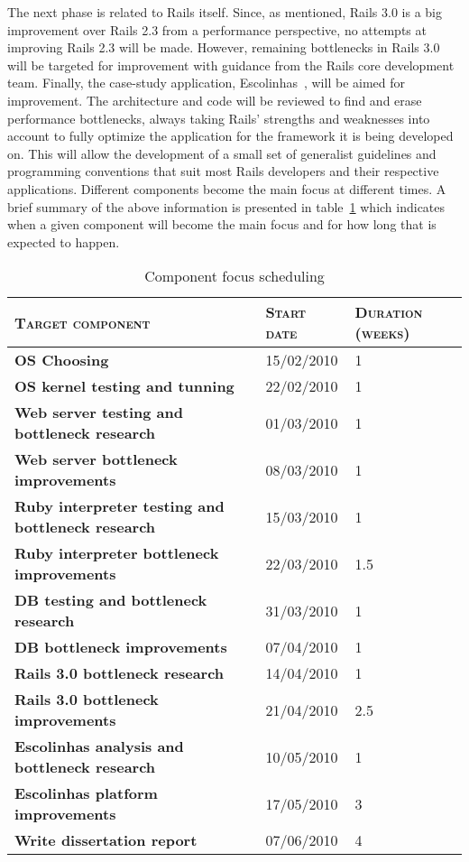 The next phase is related to Rails itself. Since, as mentioned, Rails 3.0 is a big improvement over Rails 2.3 from a performance perspective, no attempts at improving Rails 2.3 will be made. However, remaining bottlenecks in Rails 3.0 will be targeted for improvement with guidance from the Rails core development team.
Finally, the case-study application, Escolinhas~\cite{escolinhas}, will be aimed for improvement. The architecture and code will be reviewed to find and erase performance bottlenecks, always taking Rails' strengths and weaknesses into account to fully optimize the application for the framework it is being developed on. This will allow the development of a small set of generalist guidelines and programming conventions that suit most Rails developers and their respective applications.
Different components become the main focus at different times. A brief summary of the above information is presented in table~\ref{tab:research_development_schedule} which indicates when a given component will become the main focus and for how long that is expected to happen.
\begin{table}[h]
  \centering
  \begin{tabular}{p{8cm}|p{2.1cm}p{3.5cm}}
    \textsc{Target component}
  & \textsc{Start date}
  & \textsc{Duration (weeks)}
  \\
  \hline
    \textbf{OS Choosing}
  & 15/02/2010
  & 1
  \\
  \hline
    \textbf{OS kernel testing and tunning}
  & 22/02/2010
  & 1
  \\
  \hline
    \textbf{Web server testing and bottleneck research}
  & 01/03/2010
  & 1
  \\
  \hline
    \textbf{Web server bottleneck improvements}
  & 08/03/2010
  & 1
  \\
  \hline
    \textbf{Ruby interpreter testing and bottleneck research}
  & 15/03/2010
  & 1
  \\
  \hline
    \textbf{Ruby interpreter bottleneck improvements}
  & 22/03/2010
  & 1.5
  \\
  \hline
    \textbf{DB testing and bottleneck research}
  & 31/03/2010
  & 1
  \\
  \hline
    \textbf{DB bottleneck improvements}
  & 07/04/2010
  & 1
  \\
  \hline
    \textbf{Rails 3.0 bottleneck research}
  & 14/04/2010
  & 1
  \\
  \hline
    \textbf{Rails 3.0 bottleneck improvements}
  & 21/04/2010
  & 2.5
  \\
  \hline
    \textbf{Escolinhas analysis and bottleneck research}
  & 10/05/2010
  & 1
  \\
  \hline
    \textbf{Escolinhas platform improvements}
  & 17/05/2010
  & 3
  \\
  \hline
    \textbf{Write dissertation report}
  & 07/06/2010
  & 4
  \\
  \end{tabular}  
  \caption{Component focus scheduling}
  \label{tab:research_development_schedule}  
\end{table}\\
